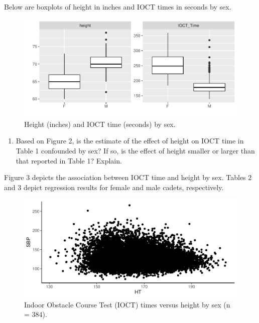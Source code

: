 \documentclass[
]{book}
\providecommand{\tightlist}{%
  \setlength{\itemsep}{0pt}\setlength{\parskip}{0pt}}
\begin{document}
\vspace{0.5in}

Below are boxplots of height in inches and IOCT times in seconds by sex.

\begin{figure}
\centering
\includegraphics{MA206supplement_files/figure-latex/unnamed-chunk-3-1.pdf}
\caption{\label{fig:unnamed-chunk-3}Height (inches) and IOCT time (seconds) by sex.}
\end{figure}

\begin{enumerate}
\def\labelenumi{\arabic{enumi}.}
\setcounter{enumi}{12}
\tightlist
\item
  Based on Figure 2, is the estimate of the effect of height on IOCT time in Table 1 confounded by sex? If so, is the effect of height smaller or larger than that reported in Table 1? Explain.
\end{enumerate}

\vspace{1in}

\newpage

Figure 3 depicts the association between IOCT time and height by sex. Tables 2 and 3 depict regression results for female and male cadets, respectively.

\begin{figure}
\centering
\includegraphics{MA206supplement_files/figure-latex/unnamed-chunk-4-1.pdf}
\caption{\label{fig:unnamed-chunk-4}Indoor Obstacle Course Test (IOCT) times versus height by sex (n = 384).}
\end{figure}
\end{document}
